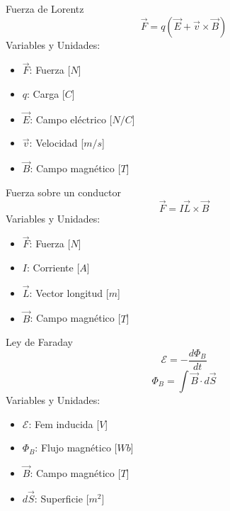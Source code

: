 \documentclass{article}
\begin{document}
\begin{multicols}{3}
\begin{teorema}{Fuerza de Lorentz}
    $$\vec{F} = q(\vec{E} + \vec{v} \times \vec{B})$$
    Variables y Unidades:
    \begin{itemize}
        \item $\vec{F}$: Fuerza [$N$]
        \item $q$: Carga [$C$]
        \item $\vec{E}$: Campo eléctrico [$N/C$]
        \item $\vec{v}$: Velocidad [$m/s$]
        \item $\vec{B}$: Campo magnético [$T$]
    \end{itemize}

    \begin{center}
    \end{center}
\end{teorema}

\begin{teorema}{Fuerza sobre un conductor}
    $$\vec{F} = I \vec{L} \times \vec{B}$$
    Variables y Unidades:
    \begin{itemize}
        \item $\vec{F}$: Fuerza [$N$]
        \item $I$: Corriente [$A$]
        \item $\vec{L}$: Vector longitud [$m$]
        \item $\vec{B}$: Campo magnético [$T$]
    \end{itemize}
\end{teorema}

\columnbreak

\begin{teorema}{Ley de Faraday}
    $$\mathcal{E} = -\frac{d\Phi_B}{dt}$$
    $$\Phi_B = \int \vec{B} \cdot d\vec{S}$$
    Variables y Unidades:
    \begin{itemize}
        \item $\mathcal{E}$: Fem inducida [$V$]
        \item $\Phi_B$: Flujo magnético [$Wb$]
        \item $\vec{B}$: Campo magnético [$T$]
        \item $d\vec{S}$: Superficie [$m^2$]
    \end{itemize}
\end{teorema}


\end{multicols}
\end{document}
